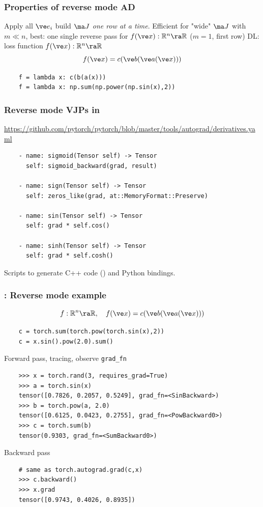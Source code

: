\documentclass[fleqn,10pt]{beamer}
\begin{document}
\begin{frame}[fragile]
    \frametitle{Properties of reverse mode AD}
    Apply all $\ve e_i$ \ra build $\ma J$ \emph{one row at a time}.
    Efficient for "wide" $\ma J$ with $m\ll n$, best: one single reverse pass for $f(\ve x): \mathbb R^n \ra \mathbb R$ ($m=1$, first row)
    \edgerow
    DL: loss function $f(\ve x): \mathbb R^n\ra \mathbb R$
    \begin{equation*}
        f(\ve x) = c(\ve b(\ve a(\ve x)))
    \end{equation*}
    \begin{verbatim}
    f = lambda x: c(b(a(x)))
    f = lambda x: np.sum(np.power(np.sin(x),2))
    \end{verbatim}
\end{frame}

\begin{frame}[fragile]
    \frametitle{Reverse mode VJPs in \pytorch}
    \url{https://github.com/pytorch/pytorch/blob/master/tools/autograd/derivatives.yaml}
    \begin{verbatim}
    - name: sigmoid(Tensor self) -> Tensor
      self: sigmoid_backward(grad, result)

    - name: sign(Tensor self) -> Tensor
      self: zeros_like(grad, at::MemoryFormat::Preserve)

    - name: sin(Tensor self) -> Tensor
      self: grad * self.cos()

    - name: sinh(Tensor self) -> Tensor
      self: grad * self.cosh()
    \end{verbatim}
    Scripts to generate C++ code () and Python bindings.
\end{frame}

\begin{frame}[fragile]
    \frametitle{\pytorch: Reverse mode example}
    \begin{equation*}
        f: \mathbb R^n\ra \mathbb R, \quad f(\ve x) = c(\ve b(\ve a(\ve x)))
    \end{equation*}
    \begin{verbatim}
    c = torch.sum(torch.pow(torch.sin(x),2))
    c = x.sin().pow(2.0).sum()
    \end{verbatim}
    Forward pass, tracing, observe \verb|grad_fn|
    \begin{verbatim}
    >>> x = torch.rand(3, requires_grad=True)
    >>> a = torch.sin(x)
    tensor([0.7826, 0.2057, 0.5249], grad_fn=<SinBackward>)
    >>> b = torch.pow(a, 2.0)
    tensor([0.6125, 0.0423, 0.2755], grad_fn=<PowBackward0>)
    >>> c = torch.sum(b)
    tensor(0.9303, grad_fn=<SumBackward0>)
    \end{verbatim}
    Backward pass
    \begin{verbatim}
    # same as torch.autograd.grad(c,x)
    >>> c.backward()
    >>> x.grad
    tensor([0.9743, 0.4026, 0.8935])
    \end{verbatim}
\end{frame}
\end{document}
